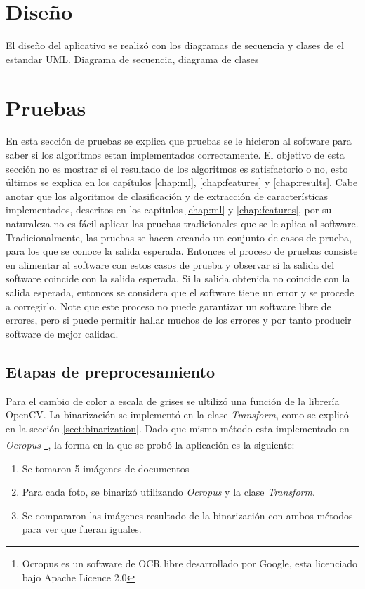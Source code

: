 \documentclass[a4paper, 11pt, oneside]{report}
\begin{document}
\section{Diseño}

El diseño del aplicativo se realizó con los diagramas de secuencia y clases de el estandar UML. Diagrama de secuencia, diagrama de clases

\section{Pruebas}
En esta sección de pruebas se explica que pruebas se le hicieron al software para saber si los algoritmos estan implementados correctamente. El objetivo de esta sección no es mostrar si el resultado de los algoritmos es satisfactorio o no, esto últimos se explica en los capítulos \ref{chap:ml}, \ref{chap:features} y \ref{chap:results}. Cabe anotar que los algoritmos de clasificación y de extracción de características implementados, descritos en los capítulos \ref{chap:ml} y \ref{chap:features}, por su naturaleza no es fácil aplicar las pruebas tradicionales que se le aplica al software.\newline \newline
Tradicionalmente, las pruebas se hacen creando un conjunto de casos de prueba, para los que se conoce la salida esperada. Entonces el proceso de pruebas consiste en alimentar al software con estos casos de prueba y observar si la salida del software coincide con la salida esperada. Si la salida obtenida no coincide con la salida esperada, entonces se considera que el software tiene un error y se procede a corregirlo. Note que este proceso no puede garantizar un software libre de errores, pero si puede permitir hallar muchos de los errores y por tanto producir software de mejor calidad.

\subsection{Etapas de preprocesamiento}
Para el cambio de color a escala de grises se ultilizó una función de la librería OpenCV. La binarización se implementó en la clase {\it Transform}, como se explicó en la sección \ref{sect:binarization}. Dado que mismo método esta implementado en {\it Ocropus} \footnote{Ocropus es un software de OCR libre desarrollado por Google, esta licenciado bajo Apache Licence 2.0}, la forma en la que se probó la aplicación es la siguiente:
\begin{enumerate}
\item Se tomaron 5 imágenes de documentos
\item Para cada foto, se binarizó utilizando {\it Ocropus} y la clase {\it Transform}.
\item Se compararon las imágenes resultado de la binarización con ambos métodos para ver que fueran iguales.
\end{enumerate}
\end{document}

